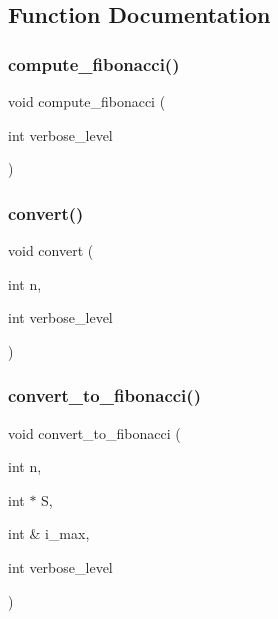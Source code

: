 \subsection{Function Documentation}
\mbox{\label{fibonacci_8_c_aad0ab3e729df30b98f713a5d5c85d590}} 
\subsubsection{\texorpdfstring{compute\+\_\+fibonacci()}{compute\_fibonacci()}}
{\footnotesize\ttfamily void compute\+\_\+fibonacci (\begin{DoxyParamCaption}\item[{int}]{verbose\+\_\+level }\end{DoxyParamCaption})}

\mbox{\label{fibonacci_8_c_a0fa464c2e7d41805ac6377c75f6bbce6}} 
\subsubsection{\texorpdfstring{convert()}{convert()}}
{\footnotesize\ttfamily void convert (\begin{DoxyParamCaption}\item[{int}]{n,  }\item[{int}]{verbose\+\_\+level }\end{DoxyParamCaption})}

\mbox{\label{fibonacci_8_c_a660cfb2b0a23ae5a1ec0bbe7d246eb51}} 
\subsubsection{\texorpdfstring{convert\+\_\+to\+\_\+fibonacci()}{convert\_to\_fibonacci()}}
{\footnotesize\ttfamily void convert\+\_\+to\+\_\+fibonacci (\begin{DoxyParamCaption}\item[{int}]{n,  }\item[{int $\ast$}]{S,  }\item[{int \&}]{i\+\_\+max,  }\item[{int}]{verbose\+\_\+level }\end{DoxyParamCaption})}

